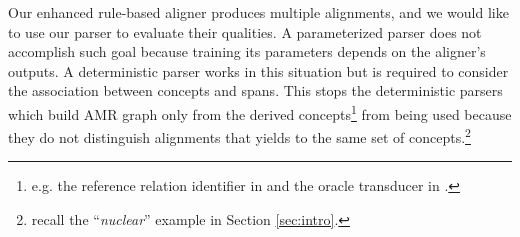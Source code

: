 \documentclass[11pt,a4paper]{article}
\begin{document}
Our enhanced rule-based aligner produces multiple alignments, and
we would like to use our parser to evaluate their qualities.
A parameterized parser does not accomplish such goal because
training its parameters depends on the aligner's outputs.
A deterministic parser works in this situation but is required to consider
the association between concepts and spans.
This stops the deterministic parsers which build AMR graph only from
the derived concepts\footnote{e.g. the reference relation identifier in \citet{flanigan-EtAl:2014:P14-1}
	and the oracle transducer in \citet{wang-xue-pradhan:2015:NAACL-HLT}.}
from being used because
they do not distinguish alignments that yields to the same set of concepts.\footnote{recall the ``\textit{nuclear}'' example in Section \ref{sec:intro}.}
\end{document}
